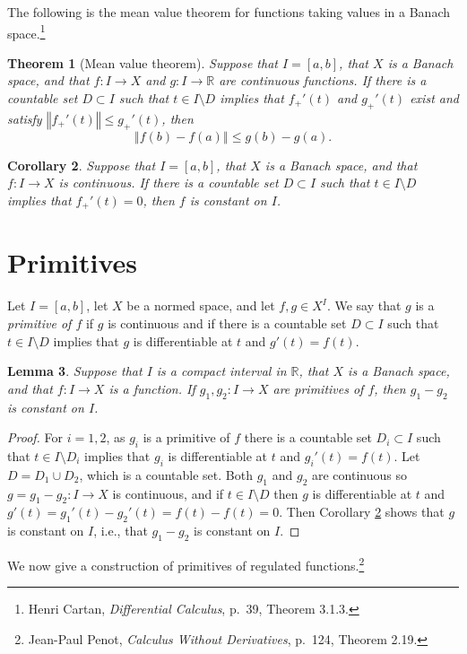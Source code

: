 \documentclass{article}
\newcommand{\norm}[1]{\left\Vert #1 \right\Vert}
\newtheorem{theorem}{Theorem}
\newtheorem{lemma}[theorem]{Lemma}
\newtheorem{corollary}[theorem]{Corollary}
\theoremstyle{definition}
\begin{document}
The following is the mean value theorem for functions taking values in a Banach space.\footnote{Henri Cartan, {\em Differential Calculus}, p.~39, Theorem 3.1.3.}

\begin{theorem}[Mean value theorem]
Suppose that $I=[a,b]$, that $X$ is a Banach space, and that $f:I \to X$ and $g:I \to \mathbb{R}$ are continuous
functions. If there is a countable set $D \subset I$ such that $t \in I \setminus D$ implies that
$f_+'(t)$ and $g_+'(t)$ exist and satisfy $\norm{f_+'(t)} \leq g_+'(t)$, then 
\[
\norm{f(b)-f(a)} \leq g(b)-g(a).
\]
\label{meanvalue}
\end{theorem}

\begin{corollary}
Suppose that $I=[a,b]$, that $X$ is a Banach space, and that $f:I \to X$ is continuous. If there is a countable set
$D \subset I$ such that $t \in I \setminus D$ implies that $f_+'(t)=0$, then $f$ is constant on $I$.
\label{constant}
\end{corollary}


\section{Primitives}
Let $I=[a,b]$, let $X$ be a normed space,  and let $f,g \in X^I$. We say that $g$ is a {\em primitive of $f$} if
$g$ is continuous and 
if there is a countable set $D \subset I$ such that $t \in I \setminus D$ implies
that $g$ is differentiable at $t$ and $g'(t)=f(t)$.

\begin{lemma}
Suppose that $I$ is a compact interval in $\mathbb{R}$, that $X$ is a Banach space, and that
$f:I \to X$ is a function. If $g_1,g_2:I \to X$ are primitives of $f$, then $g_1-g_2$ is constant on $I$.
\label{primitivedifference}
\end{lemma}
\begin{proof}
For $i=1,2$, as $g_i$ is a primitive of $f$ there is a countable set $D_i \subset I$ such that $t \in I \setminus D_i$
implies that
$g_i$ is differentiable at $t$ and $g_i'(t) = f(t)$.
Let $D=D_1 \cup D_2$, which is a countable set. Both $g_1$ and $g_2$ are continuous so $g=g_1-g_2:I \to X$ is continuous, and if $t \in I \setminus D$
then $g$ is differentiable at $t$ and $g'(t)=g_1'(t)-g_2'(t)=f(t)-f(t)=0$. Then Corollary \ref{constant} shows that $g$ is constant on
$I$, i.e., that $g_1-g_2$ is constant on $I$.\end{proof}

We now give a construction of primitives of regulated functions.\footnote{Jean-Paul Penot, {\em Calculus Without Derivatives}, p.~124, Theorem 2.19.}
\end{document}
